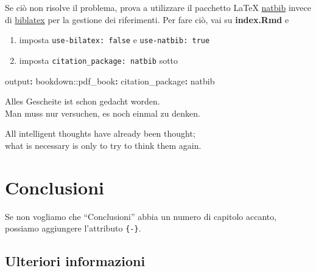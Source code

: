 \documentclass[a4paper, 11pt, nobind]{templates/ociamthesis}
\providecommand{\tightlist}{%
  \setlength{\itemsep}{0pt}\setlength{\parskip}{0pt}}
\newenvironment{Shaded}{\begin{snugshade}}{\end{snugshade}}
\newcommand{\AttributeTok}[1]{\textcolor[rgb]{0.77,0.63,0.00}{#1}}
\newcommand{\FunctionTok}[1]{\textcolor[rgb]{0.00,0.00,0.00}{#1}}
\newcommand{\KeywordTok}[1]{\textcolor[rgb]{0.13,0.29,0.53}{\textbf{#1}}}
\renewenvironment{Shaded}
{
  \vspace{10pt}%
  \begin{snugshade}%
}{%
  \end{snugshade}%
  \vspace{8pt}%
}
\begin{document}
Se ciò non risolve il problema, prova a utilizzare il pacchetto LaTeX \href{https://www.overleaf.com/learn/latex/Bibliography_management_with_natbib}{natbib} invece di \href{https://www.overleaf.com/learn\%20/latex/Articles/Getting_started_with_BibLaTeX}{biblatex} per la gestione dei riferimenti.
Per fare ciò, vai su \textbf{index.Rmd} e

\begin{enumerate}
\def\labelenumi{\arabic{enumi}.}
\tightlist
\item
  imposta \texttt{use-bilatex:\ false} e \hspace{0pt}\hspace{0pt}\texttt{use-natbib:\ true}
\item
  imposta \texttt{citation\_package:\ natbib} sotto
\end{enumerate}

\begin{Shaded}
\begin{Highlighting}[]
\FunctionTok{output}\KeywordTok{:}
\AttributeTok{  bookdown:}\FunctionTok{:pdf\_book}\KeywordTok{:}
\AttributeTok{    }\FunctionTok{citation\_package}\KeywordTok{:}\AttributeTok{ natbib}
\end{Highlighting}
\end{Shaded}

\begin{savequote}
Alles Gescheite ist schon gedacht worden.\\
Man muss nur versuchen, es noch einmal zu denken.

All intelligent thoughts have already been thought;\\
what is necessary is only to try to think them again.
\end{savequote}



\hypertarget{conclusioni}{%
\chapter*{Conclusioni}\label{conclusioni}}

Se non vogliamo che ``Conclusioni'' abbia un numero di capitolo accanto, possiamo aggiungere l'attributo \texttt{\{-\}}.

\hypertarget{ulteriori-informazioni}{%
\section*{Ulteriori informazioni}\label{ulteriori-informazioni}}
\end{document}
